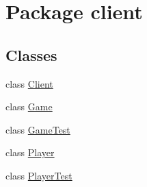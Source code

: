 \hypertarget{namespaceclient}{}\section{Package client}
\label{namespaceclient}
\subsection*{Classes}
\begin{DoxyCompactItemize}
\item 
class \hyperlink{classclient_1_1_client}{Client}
\item 
class \hyperlink{classclient_1_1_game}{Game}
\item 
class \hyperlink{classclient_1_1_game_test}{Game\+Test}
\item 
class \hyperlink{classclient_1_1_player}{Player}
\item 
class \hyperlink{classclient_1_1_player_test}{Player\+Test}
\end{DoxyCompactItemize}
